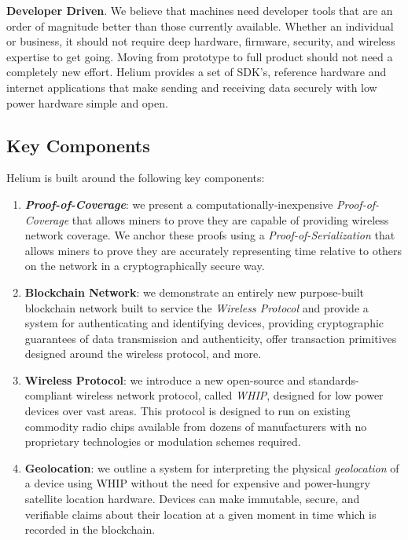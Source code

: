 \documentclass[10pt, nonatbib, nocopyrightspace, reprint]{sigplanconf}
\begin{document}
\textbf{Developer Driven}. We believe that machines need developer tools that are an order of magnitude better than those currently available. Whether an individual or business, it should not require deep hardware, firmware, security, and wireless expertise to get going. Moving from prototype to full product should not need a completely new effort. Helium provides a set of SDK's, reference hardware and internet applications that make sending and receiving data securely with low power hardware simple and open.

\subsection{Key Components}

Helium is built around the following key components:

\begin{enumerate}
  \item \textbf{\emph{Proof-of-Coverage}}: we present a computationally-inexpensive \emph{Proof-of-Coverage} that allows miners to prove they are capable of providing wireless network coverage. We anchor these proofs using a \emph{Proof-of-Serialization} that allows miners to prove they are accurately representing time relative to others on the network in a cryptographically secure way.

  \item \textbf{Blockchain Network}: we demonstrate an entirely new purpose-built blockchain network built to service the \emph{Wireless Protocol} and provide a system for authenticating and identifying devices, providing cryptographic guarantees of data transmission and authenticity, offer transaction primitives designed around the wireless protocol, and more.

    \item \textbf{Wireless Protocol}: we introduce a new open-source and standards-compliant wireless network protocol, called \emph{WHIP}, designed for low power devices over vast areas. This protocol is designed to run on existing commodity radio chips available from dozens of manufacturers with no proprietary technologies or modulation schemes required.

    \item \textbf{Geolocation}: we outline a system for interpreting the physical \emph{geolocation} of a device using WHIP without the need for expensive and power-hungry satellite location hardware. Devices can make immutable, secure, and verifiable claims about their location at a given moment in time which is recorded in the blockchain.
\end{enumerate}
\end{document}
